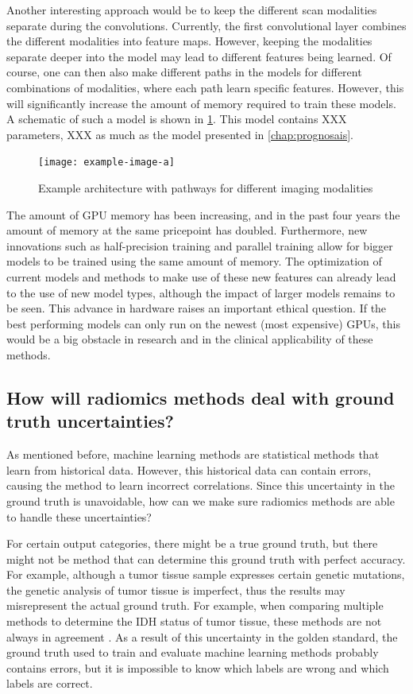 Another interesting approach would be to keep the different scan modalities separate during the convolutions.
Currently, the first convolutional layer combines the different modalities into feature maps.
However, keeping the modalities separate deeper into the model may lead to different features being learned.
Of course, one can then also make different paths in the models for different combinations of modalities, where each path learn specific features.
However, this will significantly increase the amount of memory required to train these models.
A schematic of such a model is shown in \cref{fig:discussion_architecture}.
This model contains XXX parameters, XXX as much as the model presented in \cref{chap:prognosais}.

\begin{figure}
\texttt{[image: example-image-a]}
\caption{Example architecture with pathways for different imaging modalities}\label{fig:discussion_architecture}
\end{figure}

The amount of GPU memory has been increasing, and in the past four years the amount of memory at the same pricepoint has doubled.
Furthermore, new innovations such as half-precision training and parallel training allow for bigger models to be trained using the same amount of memory.
The optimization of current models and methods to make use of these new features can already lead to the use of new model types, although the impact of larger models remains to be seen.
This advance in hardware raises an important ethical question.
If the best performing models can only run on the newest (most expensive) GPUs, this would be a big obstacle in research and in the clinical applicability of these methods.


\subsection{How will radiomics methods deal with ground truth uncertainties?}

As mentioned before, machine learning methods are statistical methods that learn from historical data.
However, this historical data can contain errors, causing the method to learn incorrect correlations.
Since this uncertainty in the ground truth is unavoidable, how can we make sure radiomics methods are able to handle these uncertainties?

For certain output categories, there might be a true ground truth, but there might not be method that can determine this ground truth with perfect accuracy.
For example, although a \gls{tumor} tissue sample expresses certain genetic mutations, the genetic analysis of tumor tissue is imperfect, thus the results may misrepresent the actual ground truth.
For example, when comparing multiple methods to determine the \gls{IDH} status of \gls{tumor} tissue, these methods are not always in agreement \autocite{pyo2016concordance}.
As a result of this uncertainty in the golden standard, the ground truth used to train and evaluate machine learning methods probably contains errors, but it is impossible to know which labels are wrong and which labels are correct.



